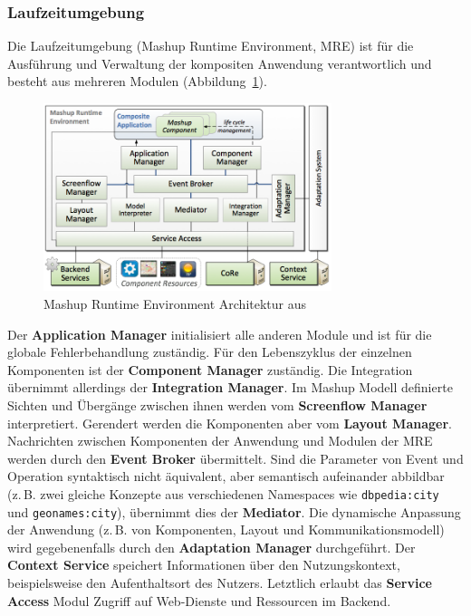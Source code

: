 \documentclass[
	headsepline,
	footsepline,
	fontsize=12pt,
	bibliography=totoc
]{scrbook}
\begin{document}
\subsubsection{Laufzeitumgebung}
\label{section:standderforschung:grundlagen:cruise_vizboard:laufzeitumgebung}

Die Laufzeitumgebung (Mashup Runtime Environment, MRE) ist für die Ausführung und Verwaltung der kompositen Anwendung verantwortlich und besteht aus mehreren Modulen (Abbildung~\ref{figure:cruise_mre}).

\begin{figure}[htbp]
	\centering
	\includegraphics[width=0.75\textwidth]{images/grundlagen-cruise_mre.png}
	\caption{Mashup Runtime Environment Architektur aus \cite{Pietschmann2012}}
	\label{figure:cruise_mre}
\end{figure}

Der \textbf{Application Manager} initialisiert alle anderen Module und ist für die globale Fehlerbehandlung zuständig. Für den Lebenszyklus der einzelnen Komponenten ist der \textbf{Component Manager} zuständig. Die Integration übernimmt allerdings der \textbf{Integration Manager}. Im Mashup Modell definierte Sichten und Übergänge zwischen ihnen werden vom \textbf{Screenflow Manager} interpretiert. Gerendert werden die Komponenten aber vom \textbf{Layout Manager}. Nachrichten zwischen Komponenten der Anwendung und Modulen der MRE werden durch den \textbf{Event Broker} übermittelt. Sind die Parameter von Event und Operation syntaktisch nicht äquivalent, aber semantisch aufeinander abbildbar (z.\,B. zwei gleiche Konzepte aus verschiedenen Namespaces wie \texttt{dbpedia:city} und \texttt{geonames:city}), übernimmt dies der \textbf{Mediator}. Die dynamische Anpassung der Anwendung (z.\,B. von Komponenten, Layout und Kommunikationsmodell) wird gegebenenfalls durch den \textbf{Adaptation Manager} durchgeführt. Der \textbf{Context Service} \cite{Pietschmann2008} speichert Informationen über den Nutzungskontext, beispielsweise den Aufenthaltsort des Nutzers. Letztlich erlaubt das \textbf{Service Access} Modul Zugriff auf Web-Dienste und Ressourcen im Backend.
\end{document}
